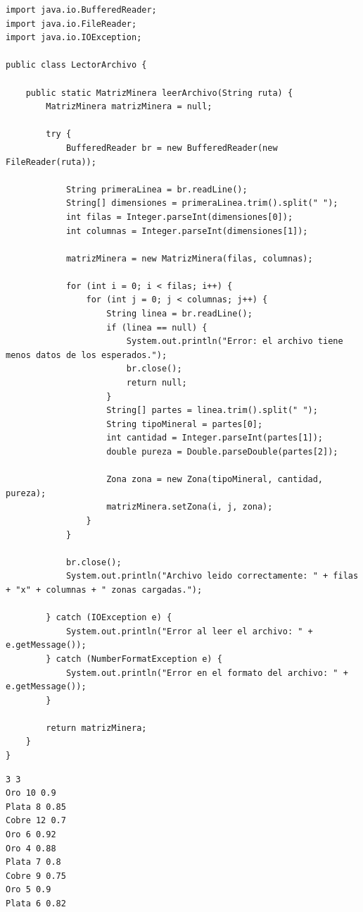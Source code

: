 \documentclass[12pt]{article}
\begin{document}
\begin{verbatim}
import java.io.BufferedReader;
import java.io.FileReader;
import java.io.IOException;

public class LectorArchivo {

    public static MatrizMinera leerArchivo(String ruta) {
        MatrizMinera matrizMinera = null;

        try {
            BufferedReader br = new BufferedReader(new FileReader(ruta));

            String primeraLinea = br.readLine();
            String[] dimensiones = primeraLinea.trim().split(" ");
            int filas = Integer.parseInt(dimensiones[0]);
            int columnas = Integer.parseInt(dimensiones[1]);

            matrizMinera = new MatrizMinera(filas, columnas);

            for (int i = 0; i < filas; i++) {
                for (int j = 0; j < columnas; j++) {
                    String linea = br.readLine();
                    if (linea == null) {
                        System.out.println("Error: el archivo tiene menos datos de los esperados.");
                        br.close();
                        return null;
                    }
                    String[] partes = linea.trim().split(" ");
                    String tipoMineral = partes[0];
                    int cantidad = Integer.parseInt(partes[1]);
                    double pureza = Double.parseDouble(partes[2]);

                    Zona zona = new Zona(tipoMineral, cantidad, pureza);
                    matrizMinera.setZona(i, j, zona);
                }
            }

            br.close();
            System.out.println("Archivo leido correctamente: " + filas + "x" + columnas + " zonas cargadas.");

        } catch (IOException e) {
            System.out.println("Error al leer el archivo: " + e.getMessage());
        } catch (NumberFormatException e) {
            System.out.println("Error en el formato del archivo: " + e.getMessage());
        }

        return matrizMinera;
    }
}

\end{verbatim}

\begin{verbatim}
3 3
Oro 10 0.9
Plata 8 0.85
Cobre 12 0.7
Oro 6 0.92
Oro 4 0.88
Plata 7 0.8
Cobre 9 0.75
Oro 5 0.9
Plata 6 0.82

\end{verbatim}
\end{document}

